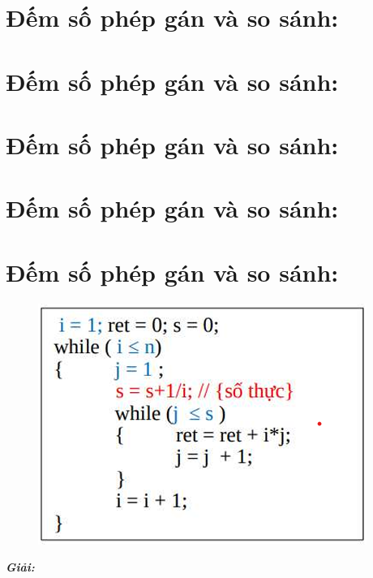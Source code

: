 \documentclass[12pt, letterpaper]{article}
\begin{document}
\section{Đếm số phép gán và so sánh:}
\section{Đếm số phép gán và so sánh:}
\section{Đếm số phép gán và so sánh:}
\section{Đếm số phép gán và so sánh:}
\section{Đếm số phép gán và so sánh:}

\begin{figure}[h]
	\centering
	\includegraphics{Bai10}
\end{figure}
{\color{red} \emph{\textbf{Giải:}}}
\end{document}
